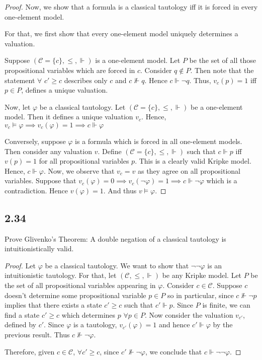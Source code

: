 \documentclass[12pt]{article}
\begin{document}
\begin{proof}
Now, we show that a formula is a classical tautology iff it is forced in every one-element model.

For that, we first show that every one-element model uniquely determines a valuation.

Suppose $(\mathcal{C} = \{c\}, \leq, \Vdash)$ is a one-element model. Let $P$ be the set of all those propositional variables which are forced in $c$. Consider $q \not \in P$. Then note that the statement $\forall$ $c' \geq c$ describes only $c$ and $c \not \Vdash q$. Hence $c \Vdash \neg q$. Thus, $v_c(p) = 1$ iff $p \in P$, defines a unique valuation.

Now, let $\varphi$ be a classical tautology. Let $(\mathcal{C} = \{c\}, \leq, \Vdash)$ be a one-element model. Then it defines a unique valuation $v_c$. Hence, $v_c \vDash \varphi \implies v_c(\varphi) = 1 \implies c \Vdash \varphi$

Conversely, suppose $\varphi$ is a formula which is forced in all one-element models. Then consider any valuation $v$. Define $(\mathcal{C} = \{c\}, \leq, \Vdash)$ such that $c \Vdash p$ iff $v(p) = 1$ for all propositional variables $p$. This is a clearly valid Kripke model. Hence, $c \Vdash \varphi$. Now, we observe that $v_c = v$ as they agree on all propositional variables. Suppose that $v_c(\varphi) = 0 \implies v_c(\neg \varphi) = 1 \implies c \Vdash \neg \varphi$ which is a contradiction. Hence $v(\varphi) = 1$. And thus $v \vDash \varphi$.
\end{proof}

\subsection*{2.34}
Prove Glivenko's Theorem: A double negation of a classical tautology is intuitionistically valid. \\

\begin{proof}
Let $\varphi$ be a classical tautology. We want to show that $\neg \neg \varphi$ is an intuitionistic tautology. For that, let $(\mathcal{C}, \leq, \Vdash)$ be any Kripke model. Let $P$ be the set of all propositional variables appearing in $\varphi$. Consider $c \in \mathcal{C}$. Suppose $c$ doesn't determine some propositional variable $p \in P$ so in particular, since $c \not \Vdash \neg p$ implies that there exists a state $c' \geq c$ such that $c' \Vdash p$. Since $P$ is finite, we can find a state $c' \geq c$ which determines $p$ $\forall p \in P$. Now consider the valuation $v_{c'}$, defined by $c'$. Since $\varphi$ is a tautology, $v_{c'}(\varphi) = 1$ and hence $c' \Vdash \varphi$ by the previous result. Thus $c \not \Vdash \neg \varphi$. 

Therefore, given $c \in \mathcal{C}$, $\forall c' \geq c$, since $c' \not \Vdash \neg \varphi$, we conclude that $c \Vdash \neg \neg \varphi$.
\end{proof}
\end{document}
